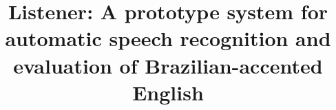 \documentclass[twocolumn]{bmcart}%
\begin{document}
\begin{frontmatter}
\thispagestyle{plain}
\begin{fmbox}

\title{Listener: A prototype system for automatic speech recognition and evaluation of
Brazilian-accented English}


\author[
   addressref={aff1},                   %
   corref={aff1},                       %
   noteref={n1},                        %
   email={gustavoauma@gmail.com}   %
]{ }
\author[
   addressref={aff1},
   email={sandram@icmc.usp.br}
]{ }


\address[id=aff1]{%
  , %
  ,                     %
  ,                              %
}


\end{fmbox}
\end{frontmatter}
\end{document}
